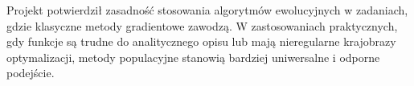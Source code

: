 \documentclass[a4paper]{article}
\begin{document}
Projekt potwierdził zasadność stosowania algorytmów ewolucyjnych w zadaniach, gdzie klasyczne metody gradientowe zawodzą. W zastosowaniach praktycznych, gdy funkcje są trudne do analitycznego opisu lub mają nieregularne krajobrazy optymalizacji, metody populacyjne stanowią bardziej uniwersalne i odporne podejście.
\end{document}
